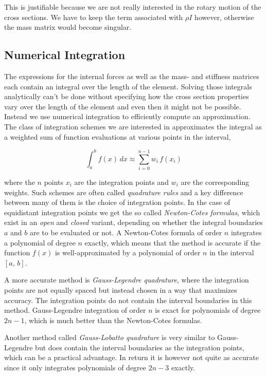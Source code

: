 This is justifiable because we are not really interested in the rotary motion of the cross sections.
We have to keep the term associated with $\rho I$ however, otherwise the mass matrix would become singular.

\subsection{Numerical Integration}

The expressions for the internal forces as well as the mass- and stiffness matrices each contain an integral over the length of the element.
Solving those integrals analytically can't be done without specifying how the cross section properties vary over the length of the element and even then it might not be possible.
Instead we use numerical integration to efficiently compute an approximation.
The class of integration schemes we are interested in approximates the integral as a weighted sum of function evaluations at various points in the interval,

\begin{equation}
\int_{a}^{b}f(x)\,dx \approx \sum_{i=0}^{n-1} w_{i}\,f(x_{i})
\end{equation}

where the $n$ points $x_{i}$ are the integration points and $w_{i}$ are the corresponding weights.
Such schemes are often called \textit{quadrature rules} and a key difference between many of them is the choice of integration points.
In the case of equidistant integration points we get the so called \textit{Newton-Cotes formulas}, which exist in an \textit{open} and \textit{closed} variant, depending on whether the integral boundaries $a$ and $b$ are to be evaluated or not.
A Newton-Cotes formula of order $n$ integrates a polynomial of degree $n$ exactly, which means that the method is accurate if the function $f(x)$ is well-approximated by a polynomial of order $n$ in the interval $[a,\,b]$.

A more accurate method is \textit{Gauss-Legendre quadrature}, where the integration points are not equally spaced but instead chosen in a way that maximizes accuracy.
The integration points do not contain the interval boundaries in this method.
Gauss-Legendre integration of order $n$ is exact for polynomials of degree $2n-1$, which is much better than the Newton-Cotes formulas.

Another method called \textit{Gauss-Lobatto quadrature} is very similar to Gauss-Legendre but does contain the interval boundaries as the integration points, which can be a practical advantage.
In return it is however not quite as accurate since it only integrates polynomials of degree $2n-3$ exactly.


